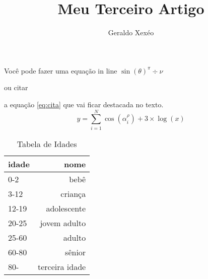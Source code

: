 \documentclass{article}
\title{Meu Terceiro Artigo}
\author{Geraldo Xexéo}
\begin{document}
\maketitle

Você pode fazer uma equação in line
$\sin(\theta)^\pi \div \nu$

ou citar
  
a equação \ref{eq:cita} que vai ficar destacada no texto.
\begin{equation}\label{eq:cita}
  y = \sum^{N}_{i=1} \cos(\alpha_i^\rho)+3\times \log(x)
\end{equation}

\begin{table}[hbt]
    \caption{Tabela de Idades}
    \centering
    \label{tab:idades}
    \begin{tabular}{|lr|}
        \hline
        \textbf{idade} & \textbf{nome} \\
        \hline
        0-2 & bebê \\
        3-12 & criança \\
        12-19 & adolescente \\
        20-25 & jovem adulto \\
        25-60 & adulto \\
        60-80 & sênior \\
        80- & terceira idade \\
        \hline
    \end{tabular}


\end{table}
\end{document}
